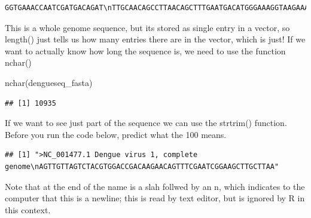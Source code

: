 \documentclass[
]{book}
\newenvironment{Shaded}{\begin{snugshade}}{\end{snugshade}}
\newcommand{\FunctionTok}[1]{\textcolor[rgb]{0.00,0.00,0.00}{#1}}
\newcommand{\NormalTok}[1]{#1}
\begin{document}
\begin{verbatim}
GGTGAAACCAATCGATGACAGAT\nTTGCAACAGCCTTAACAGCTTTGAATGACATGGGAAAGGTAAGAAAAGACATACCGCAATGGGAACCTTC\nAAAAGGATGGAATGATTGGCAACAAGTGCCTTTCTGTTCACACCATTTCCACCAGCTGATTATGAAGGAT\nGGGAGGGAGATAGTGGTGCCATGCCGCAACCAAGATGAACTTGTAGGTAGGGCCAGAGTATCACAAGGCG\nCCGGATGGAGCTTGAGAGAAACTGCATGCCTAGGCAAGTCATATGCACAAATGTGGCAGCTGATGTACTT\nCCACAGGAGAGACTTGAGATTAGCGGCTAATGCTATCTGTTCAGCCGTTCCAGTTGATTGGGTCCCAACC\nAGCCGCACCACCTGGTCGATCCATGCCCACCATCAATGGATGACAACAGAAGACATGTTGTCAGTGTGGA\nATAGGGTTTGGATAGAGGAAAACCCATGGATGGAGGACAAGACTCATGTGTCCAGTTGGGAAGACGTTCC\nATACCTAGGAAAAAGGGAAGATCAATGGTGTGGTTCCCTAATAGGCTTAACAGCACGAGCCACCTGGGCC\nACCAACATACAAGTGGCCATAAACCAAGTGAGAAGGCTCATTGGGAATGAGAATTATCTAGACTTCATGA\nCATCAATGAAGAGATTCAAAAACGAGAGTGATCCCGAAGGGGCACTCTGGTAAGCCAACTCATTCACAAA\nATAAAGGAAAATAAAAAATCAAACAAGGCAAGAAGTCAGGCCGGATTAAGCCATAGCACGGTAAGAGCTA\nTGCTGCCTGTGAGCCCCGTCCAAGGACGTAAAATGAAGTCAGGCCGAAAGCCACGGTTCGAGCAAGCCGT\nGCTGCCTGTAGCTCCATCGTGGGGATGTAAAAACCCGGGAGGCTGCAAACCATGGAAGCTGTACGCATGG\nGGTAGCAGACTAGTGGTTAGAGGAGACCCCTCCCAAGACACAACGCAGCAGCGGGGCCCAACACCAGGGG\nAAGCTGTACCCTGGTGGTAAGGACTAGAGGTTAGAGGAGACCCCCCGCACAACAACAAACAGCATATTGA\nCGCTGGGAGAGACCAGAGATCCTGCTGTCTCTACAGCATCATTCCAGGCACAGAACGCCAAAAAATGGAA\nTGGTGCTGTTGAATCAACAGGTTCT\n\n"
\end{verbatim}

This is a whole genome sequence, but its stored as single entry in a vector, so length() just tells us how many entries there are in the vector, which is just! If we want to actually know how long the sequence is, we need to use the function nchar()

\begin{Shaded}
\begin{Highlighting}[]
\FunctionTok{nchar}\NormalTok{(dengueseq\_fasta)}
\end{Highlighting}
\end{Shaded}

\begin{verbatim}
## [1] 10935
\end{verbatim}

If we want to see just part of the sequence we can use the strtrim() function. Before you run the code below, predict what the 100 means.

\begin{verbatim}
## [1] ">NC_001477.1 Dengue virus 1, complete genome\nAGTTGTTAGTCTACGTGGACCGACAAGAACAGTTTCGAATCGGAAGCTTGCTTAA"
\end{verbatim}

Note that at the end of the name is a slah follwed by an n, which indicates to the computer that this is a newline; this is read by text editor, but is ignored by R in this context.
\end{document}
